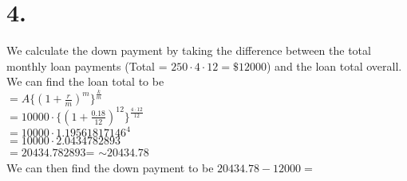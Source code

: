 \documentclass{article}
\begin{document}
\section*{4.}
{\Large 
We calculate the down payment by taking the difference between the total monthly loan payments (Total = $250 \cdot 4 \cdot 12 = \text{\$}12000$) and the loan total overall. \\
We can find the loan total to be \\
$= A \{(1 + \frac{r}{m})^m\}^{\frac{k}{m}}$ \\
$= 10000 \cdot \{(1 + \frac{0.18}{12})^{12}\}^{\frac{4 \cdot 12}{12}}$ \\
$= 10000 \cdot 1.19561817146^4$ \\
$= 10000 \cdot 2.0434782893$ \\
$= 20434.782893 $= $\sim 20434.78$  \\
We can then find the down payment to be $20434.78 - 12000 = $ 

}
\end{document}
